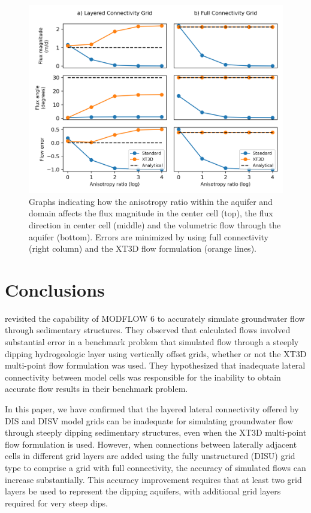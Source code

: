 \documentclass{article}
\begin{document}
\begin{figure}
	\begin{center}
	\includegraphics[scale=0.9]{../figures/fig5paper.png}
	\caption{Graphs indicating how the anisotropy ratio within the aquifer and domain affects the flux magnitude in the center cell (top), the flux direction in center cell (middle) and the volumetric flow through the aquifer (bottom). Errors are minimized by using full connectivity (right column) and the XT3D flow formulation (orange lines).}
	\label{fig:fig5}
	\end{center}
\end{figure}

\section*{Conclusions}

\cite{bardot2023} revisited the capability of MODFLOW 6 to accurately simulate groundwater flow through sedimentary structures. They observed that calculated flows involved substantial error in a benchmark problem that simulated flow through a steeply dipping hydrogeologic layer using vertically offset grids, whether or not the XT3D multi-point flow formulation was used. They hypothesized that inadequate lateral connectivity between model cells was responsible for the inability to obtain accurate flow results in their benchmark problem.

In this paper, we have confirmed that the layered lateral connectivity offered by DIS and DISV model grids can be inadequate for simulating groundwater flow through steeply dipping sedimentary structures, even when the XT3D multi-point flow formulation is used.  However, when connections between laterally adjacent cells in different grid layers are added using the fully unstructured (DISU) grid type to comprise a grid with full connectivity, the accuracy of simulated flows can increase substantially. This accuracy improvement requires that at least two grid layers be used to represent the dipping aquifers, with additional grid layers required for very steep dips.
\end{document}
